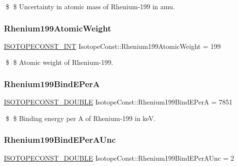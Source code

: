 \$ \$ Uncertainty in atomic mass of Rhenium-\/199 in amu. \mbox{\label{group___isotope_const-_rhenium-_re199_ga009fedd36a263398a9fac371d37bfb89}} 
\subsubsection{\texorpdfstring{Rhenium199\+Atomic\+Weight}{Rhenium199AtomicWeight}}
{\footnotesize\ttfamily \mbox{\hyperlink{group___isotope_const-_macros_ga5f18360b3e99483a35c32d789e62621c}{I\+S\+O\+T\+O\+P\+E\+C\+O\+N\+S\+T\+\_\+\+I\+NT}} Isotope\+Const\+::\+Rhenium199\+Atomic\+Weight = 199}

\$ \$ Atomic weight of Rhenium-\/199. \mbox{\label{group___isotope_const-_rhenium-_re199_gac7bc9b46e5c13b3f7309847246d203bf}} 
\subsubsection{\texorpdfstring{Rhenium199\+Bind\+E\+PerA}{Rhenium199BindEPerA}}
{\footnotesize\ttfamily \mbox{\hyperlink{group___isotope_const-_macros_ga8f45a7272ce02c0b4c65c44636ed719a}{I\+S\+O\+T\+O\+P\+E\+C\+O\+N\+S\+T\+\_\+\+D\+O\+U\+B\+LE}} Isotope\+Const\+::\+Rhenium199\+Bind\+E\+PerA = 7851}

\$ \$ Binding energy per A of Rhenium-\/199 in keV. \mbox{\label{group___isotope_const-_rhenium-_re199_ga7b94ebfc50455f7245562d9037c22669}} 
\subsubsection{\texorpdfstring{Rhenium199\+Bind\+E\+Per\+A\+Unc}{Rhenium199BindEPerAUnc}}
{\footnotesize\ttfamily \mbox{\hyperlink{group___isotope_const-_macros_ga8f45a7272ce02c0b4c65c44636ed719a}{I\+S\+O\+T\+O\+P\+E\+C\+O\+N\+S\+T\+\_\+\+D\+O\+U\+B\+LE}} Isotope\+Const\+::\+Rhenium199\+Bind\+E\+Per\+A\+Unc = 2}

